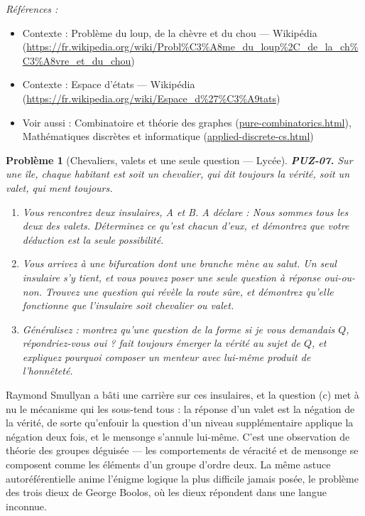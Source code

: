 \documentclass[11pt]{article}
\newtheorem{problem}{Problème}
\newenvironment{refs}{\par\small\noindent\emph{Références :}\begin{itemize}\setlength\itemsep{0pt}}{\end{itemize}\normalsize}
\begin{document}
\begin{refs}
\item Contexte : Problème du loup, de la chèvre et du chou --- Wikipédia (\url{https://fr.wikipedia.org/wiki/Probl%C3%A8me_du_loup%2C_de_la_ch%C3%A8vre_et_du_chou})
\item Contexte : Espace d'états --- Wikipédia (\url{https://fr.wikipedia.org/wiki/Espace_d%27%C3%A9tats})
\item Voir aussi : Combinatoire et théorie des graphes (\url{pure-combinatorics.html}), Mathématiques discrètes et informatique (\url{applied-discrete-cs.html})
\end{refs}

\bigskip

\begin{problem}[{Chevaliers, valets et une seule question --- Lycée}]
\textbf{PUZ-07.} Sur une île, chaque habitant est soit un chevalier, qui dit toujours
la vérité, soit un valet, qui ment toujours.
\begin{enumerate}
\item[(a)] Vous rencontrez deux insulaires, A et B. A déclare : \og{} Nous sommes tous les deux des
valets. \fg{} Déterminez ce qu'est chacun d'eux, et démontrez que votre déduction est la seule
possibilité.
\item[(b)] Vous arrivez à une bifurcation dont une branche mène au salut. Un seul insulaire s'y
tient, et vous pouvez poser une seule question à réponse oui-ou-non. Trouvez une question
qui révèle la route sûre, et démontrez qu'elle fonctionne que l'insulaire soit chevalier
ou valet.
\item[(c)] Généralisez : montrez qu'une question de la forme \og{} si je vous demandais $ Q $,
répondriez-vous oui ? \fg{} fait toujours émerger la vérité au sujet de $ Q $, et expliquez
pourquoi composer un menteur avec lui-même produit de l'honnêteté.
\end{enumerate}

\end{problem}

\noindent Raymond Smullyan a bâti une carrière sur ces insulaires, et la question
(c) met à nu le mécanisme qui les sous-tend tous : la réponse d'un valet est la négation de
la vérité, de sorte qu'enfouir la question d'un niveau supplémentaire applique la négation
deux fois, et le mensonge s'annule lui-même. C'est une observation de théorie des groupes
déguisée --- les comportements de véracité et de mensonge se composent comme les éléments
d'un groupe d'ordre deux. La même astuce autoréférentielle anime l'énigme logique la plus
difficile jamais posée, le problème des trois dieux de George Boolos, où les dieux
répondent dans une langue inconnue.
\end{document}
